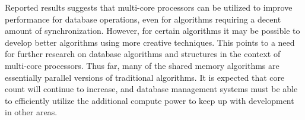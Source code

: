 Reported results suggests that multi-core processors can be utilized
to improve performance for database operations, even for algorithms
requiring a decent amount of synchronization. However, for certain
algorithms it may be possible to develop better algorithms using more
creative techniques. This points to a need for further research on
database algorithms and structures in the context of multi-core
processors. Thus far, many of the shared memory algorithms are
essentially parallel versions of traditional algorithms. It is
expected that core count will continue to increase, and database
management systems must be able to efficiently utilize the additional
compute power to keep up with development in other areas.
